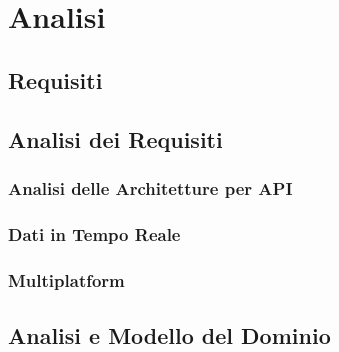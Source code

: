 \chapter{Analisi}\label{chap:analysis}
\section{Requisiti}\label{sec:requirements}
\section{Analisi dei Requisiti}\label{sec:requirements-analysis}
\subsection{Analisi delle Architetture per API}\label{ssec:apis}
\subsection{Dati in Tempo Reale}\label{ssec:real-time-data}
\subsection{Multiplatform}\label{ssec:multiplatform}
\section{Analisi e Modello del Dominio}\label{sec:domain-analysis}

